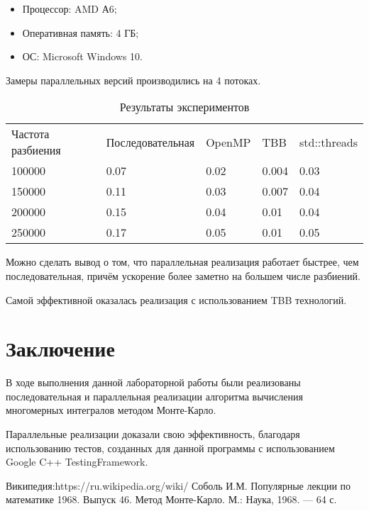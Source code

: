 \documentclass{report}
\begin{document}
\begin{itemize}
\item Процессор: AMD А6;
\item Оперативная память: 4 ГБ;
\item ОС: Microsoft Windows 10.
\end{itemize}
\par Замеры параллельных версий производились на 4 потоках.
\begin{table}[!h]
\caption{Результаты экспериментов}
\centering
\begin{tabular}{lllll}
Частота разбиения & Последовательная & OpenMP & TBB & std::threads     \\
100000    & 0.07                    & 0.02       & 0.004    & 0.03     \\
150000    & 0.11                    & 0.03       & 0.007    & 0.04     \\
200000   & 0.15                    & 0.04       & 0.01      & 0.04     \\
250000   & 0.17                   & 0.05       & 0.01       & 0.05     \\
\end{tabular}
\end{table}

\par Можно сделать вывод о том, что параллельная реализация работает быстрее, чем последовательная, причём ускорение более заметно на большем числе разбиений.
\par Самой эффективной оказалась реализация с использованием TBB технологий.
\newpage

\section*{Заключение}
В ходе выполнения данной лабораторной работы были реализованы последовательная и параллельная реализации алгоритма вычисления многомерных интегралов методом Монте-Карло.
\par Параллельные реализации доказали свою эффективность, благодаря использованию тестов, созданных для данной программы с использованием Google C++ TestingFramework.
\newpage

\begin{thebibliography}{1}
 Википедия:https://ru.wikipedia.org/wiki/%
 Соболь И.М. Популярные лекции по математике 1968. Выпуск 46.
Метод Монте-Карло. М.: Наука, 1968. — 64 с.
\end{thebibliography}
\newpage
\end{document}
